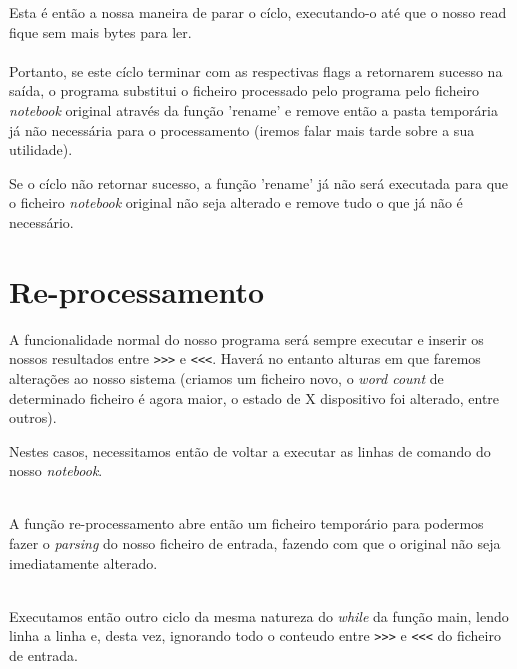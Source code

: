 \documentclass[11pt,a4paper]{report}
\begin{document}
Esta é então a nossa maneira de parar o cíclo, executando-o até que o nosso read fique sem mais bytes para ler.
~\\

~\\

Portanto, se este cíclo terminar com as respectivas flags a retornarem sucesso na saída, o programa substitui o ficheiro processado pelo programa pelo ficheiro  \textit{notebook} original através da função 'rename' e remove então a pasta temporária já não necessária para o processamento (iremos falar mais tarde sobre a sua utilidade).

Se o cíclo não retornar sucesso, a função 'rename' já não será executada para que o ficheiro \textit{notebook} original não seja alterado e remove tudo o que já não é necessário.


\section{Re-processamento}

A funcionalidade normal do nosso programa será sempre executar e inserir os nossos resultados entre \verb|>>>| e \verb|<<<|.
Haverá no entanto alturas em que faremos alterações ao nosso sistema (criamos um ficheiro novo, o \textit{word count} de determinado ficheiro é agora maior, o estado de X dispositivo foi alterado, entre outros). 

Nestes casos, necessitamos então de voltar a executar as linhas de comando do nosso \textit{notebook}.



~\\

A função re-processamento abre então um ficheiro temporário para podermos fazer o \textit{parsing} do nosso ficheiro de entrada, fazendo com que o original não seja imediatamente alterado.


~\\

Executamos então outro ciclo da mesma natureza do \textit{while} da função main, lendo linha a linha e, desta vez, ignorando todo o conteudo entre \verb|>>>| e \verb|<<<| do ficheiro de entrada.
\end{document}
